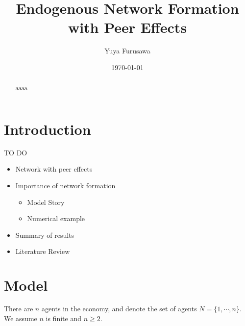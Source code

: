 \documentclass[12pt]{article}
\theoremstyle{definition}
\begin{document}
\title{Endogenous Network Formation with Peer Effects}

\author{Yuya Furusawa}

\date{\today}

\maketitle

\begin{abstract}
aaaa
\end{abstract}


\section{Introduction}

TO DO
\begin{itemize}
	\item Network with peer effects
	\item Importance of network formation
	\begin{itemize}
 		\item Model Story
 		\item Numerical example
 	\end{itemize}
 	\item Summary of results
  	\item Literature Review
\end{itemize}


\section{Model}

There are $n$ agents in the economy, and denote the set of agents $N = \{ 1, \cdots, n\}$.
We assume $n$ is finite and $n \ge 2$.
\end{document}
